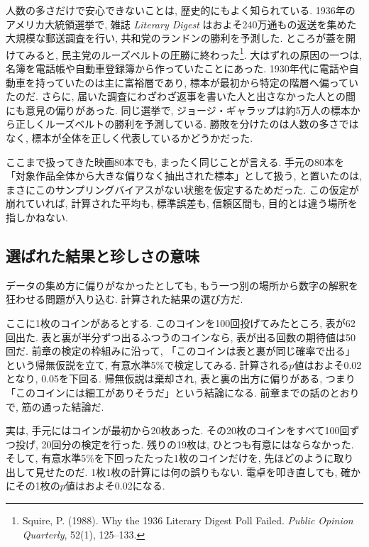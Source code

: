     人数の多さだけで安心できないことは, 歴史的にもよく知られている.
    1936年のアメリカ大統領選挙で, 雑誌 \textit{Literary Digest} はおよそ240万通もの返送を集めた大規模な郵送調査を行い, 共和党のランドンの勝利を予測した.
    ところが蓋を開けてみると, 民主党のルーズベルトの圧勝に終わった\footnote{Squire, P. (1988). Why the 1936 Literary Digest Poll Failed. \textit{Public Opinion Quarterly}, 52(1), 125--133.}.
    大はずれの原因の一つは, 名簿を電話帳や自動車登録簿から作っていたことにあった.
    1930年代に電話や自動車を持っていたのは主に富裕層であり, 標本が最初から特定の階層へ偏っていたのだ.
    さらに, 届いた調査にわざわざ返事を書いた人と出さなかった人との間にも意見の偏りがあった.
    同じ選挙で, ジョージ・ギャラップは約5万人の標本から正しくルーズベルトの勝利を予測している.
    勝敗を分けたのは人数の多さではなく, 標本が全体を正しく代表しているかどうかだった.

    ここまで扱ってきた映画80本でも, まったく同じことが言える.
    手元の80本を「対象作品全体から大きな偏りなく抽出された標本」として扱う, と置いたのは, まさにこのサンプリングバイアスがない状態を仮定するためだった.
    この仮定が崩れていれば, 計算された平均も, 標準誤差も, 信頼区間も, 目的とは違う場所を指しかねない.

  \subsection{選ばれた結果と珍しさの意味}

    データの集め方に偏りがなかったとしても, もう一つ別の場所から数字の解釈を狂わせる問題が入り込む.
    計算された結果の選び方だ.

    ここに1枚のコインがあるとする.
    このコインを100回投げてみたところ, 表が62回出た.
    表と裏が半分ずつ出るふつうのコインなら, 表が出る回数の期待値は50回だ.
    前章の検定の枠組みに沿って, 「このコインは表と裏が同じ確率で出る」という帰無仮説を立て, 有意水準5\%で検定してみる.
    計算される$p$値はおよそ0.02となり, 0.05を下回る.
    帰無仮説は棄却され, 表と裏の出方に偏りがある, つまり「このコインには細工がありそうだ」という結論になる.
    前章までの話のとおりで, 筋の通った結論だ.

    実は, 手元にはコインが最初から20枚あった.
    その20枚のコインをすべて100回ずつ投げ, 20回分の検定を行った.
    残りの19枚は, ひとつも有意にはならなかった.
    そして, 有意水準5\%を下回ったたった1枚のコインだけを, 先ほどのように取り出して見せたのだ.
    1枚1枚の計算には何の誤りもない.
    電卓を叩き直しても, 確かにその1枚の$p$値はおよそ0.02になる.

